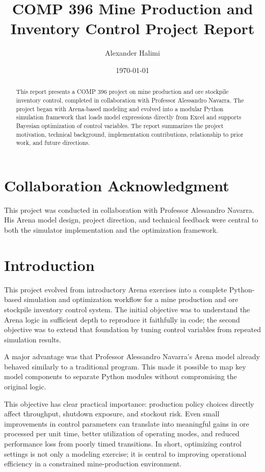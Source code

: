 \documentclass[11pt]{article}
\title{COMP 396 Mine Production and Inventory Control Project Report}
\author{Alexander Halimi}
\date{\today}
\begin{document}
\maketitle

\begin{abstract}
This report presents a COMP 396 project on mine production and ore stockpile inventory control, completed in collaboration with Professor Alessandro Navarra. The project began with Arena-based modeling and evolved into a modular Python simulation framework that loads model expressions directly from Excel and supports Bayesian optimization of control variables. The report summarizes the project motivation, technical background, implementation contributions, relationship to prior work, and future directions.
\end{abstract}

\section*{Collaboration Acknowledgment}
This project was conducted in collaboration with Professor Alessandro Navarra. His Arena model design, project direction, and technical feedback were central to both the simulator implementation and the optimization framework.

\section{Introduction}
This project evolved from introductory Arena exercises into a complete Python-based simulation and optimization workflow for a mine production and ore stockpile inventory control system. The initial objective was to understand the Arena logic in sufficient depth to reproduce it faithfully in code; the second objective was to extend that foundation by tuning control variables from repeated simulation results.

A major advantage was that Professor Alessandro Navarra's Arena model already behaved similarly to a traditional program. This made it possible to map key model components to separate Python modules without compromising the original logic.

This objective has clear practical importance: production policy choices directly affect throughput, shutdown exposure, and stockout risk. Even small improvements in control parameters can translate into meaningful gains in ore processed per unit time, better utilization of operating modes, and reduced performance loss from poorly timed transitions. In short, optimizing control settings is not only a modeling exercise; it is central to improving operational efficiency in a constrained mine-production environment.
\end{document}
